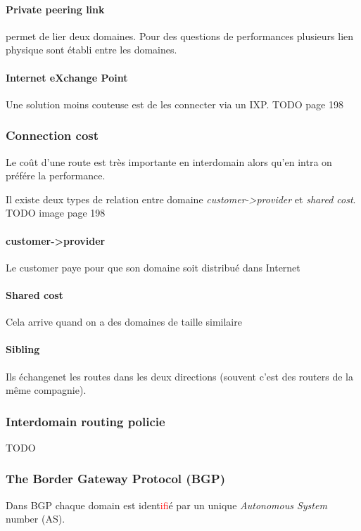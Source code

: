 \paragraph{Private peering link} permet de lier deux domaines. Pour des questions
de performances plusieurs lien physique sont établi entre les domaines.

\paragraph{Internet eXchange Point} Une solution moins couteuse est de les connecter
via un IXP. TODO page 198

\subsubsection{Connection cost} Le coût d'une route est très importante en interdomain
alors qu'en intra on préfére la performance.

Il existe deux types de relation entre domaine \textit{customer->provider} et \textit{
shared cost}.
TODO image page 198

\paragraph{customer->provider}
Le customer paye pour que son domaine soit distribué dans Internet

\paragraph{Shared cost}
Cela arrive quand on a des domaines de taille similaire

\paragraph{Sibling}
Ils échangenet les routes dans les deux directions (souvent c'est des routers
de la même compagnie).

\subsubsection{Interdomain routing policie}
TODO

\subsubsection{The Border Gateway Protocol (BGP)}
Dans BGP chaque domain est ident\textcolor{red}{if}ié par un unique \textit{Autonomous System} number (AS).

